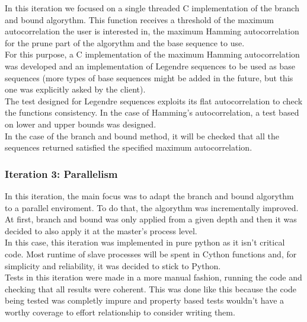       In this iteration we focused on a single threaded C implementation of the
      branch and bound algorythm. This function receives a threshold of the
      maximum autocorrelation the user is interested in, the maximum Hamming
      autocorrelation for the prune part of the algorythm and the base sequence
      to use.\\

      For this purpose, a C implementation of the maximum Hamming
      autocorrelation was developed and an implementation of Legendre sequences
      to be used as base sequences (more types of base sequences might be added
      in the future, but this one was explicitly asked by the client).\\

      The test designed for Legendre sequences exploits its flat
      autocorrelation to check the functions consistency. In the case of
      Hamming's autocorrelation, a test based on lower and upper
      bounds was designed.\\

      In the case of the branch and bound method, it will be checked that all the
      sequences returned satisfied the specified maximum autocorrelation.\\

      \subsubsection{Iteration 3: Parallelism}

      In this iteration, the main focus was to adapt the branch and bound algorythm
      to a parallel enviroment. To do that, the algorythm was incrementally
      improved. At first, branch and bound was only applied from a given depth and
      then it was decided to also apply it at the master's process level.\\

      In this case, this iteration was implemented in pure python as it isn't
      critical code. Most runtime of slave processes will be spent in Cython
      functions and, for simplicity and reliability, it was decided to stick to
      Python.\\

      Tests in this iteration were made in a more manual fashion, running the
      code and checking that all results were coherent. This was done like
      this because the code being tested was completly impure and property
      based tests wouldn't have a worthy coverage to effort relationship to
      consider writing them.\\

